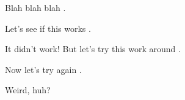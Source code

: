 \documentclass{article}
\begin{document}
Blah blah blah \citet{CharnessDufwenberg2006}.

Let's see if this works \citep[\textit{c.f.},][]{CharnessDufwenberg2006}.

It didn't work! But let's try this work around \citep{BeattieLoomes1997}.

Now let's try again \citep[\textit{c.f.},][]{CharnessDufwenberg2006}.

Weird, huh?
\end{document}
